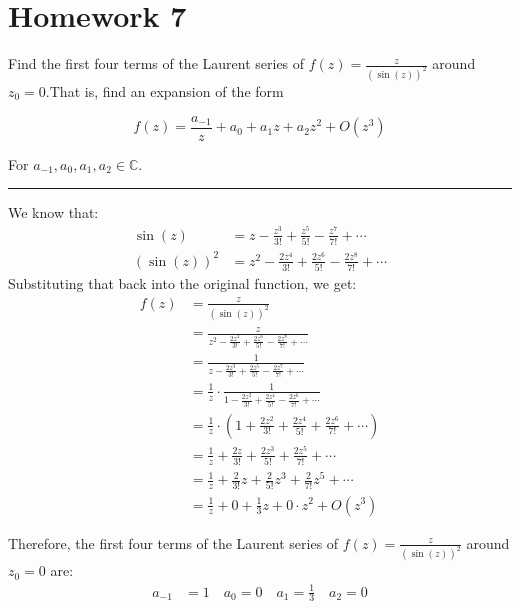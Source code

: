 \chapter{Homework 7}

\begin{example}

    Find the first four terms of the Laurent series of $f(z)=\frac z{\left(\sin(z)\right)^2}$ around $z_0=0$.That is, find an expansion of the form

    $$f(z)=\frac{a_{-1}}z+a_0+a_1z+a_2z^2+O(z^3)$$

    For $a_{-1},a_0,a_1,a_2\in\mathbb{C}.$

    \hrule
    \vspace{0.5cm}

    We know that:
    \begin{align*}
        \sin(z)                & =z-\frac{z^3}{3!}+\frac{z^5}{5!}-\frac{z^7}{7!}+\cdots      \\
        \left(\sin(z)\right)^2 & =z^2-\frac{2z^4}{3!}+\frac{2z^6}{5!}-\frac{2z^8}{7!}+\cdots
    \end{align*}
    Substituting that back into the original function, we get:
    \begin{align*}
        f(z) & =\frac z{\left(\sin(z)\right)^2}                                                    \\
             & =\frac z{z^2-\frac{2z^4}{3!}+\frac{2z^6}{5!}-\frac{2z^8}{7!}+\cdots}                \\
             & =\frac 1{z-\frac{2z^3}{3!}+\frac{2z^5}{5!}-\frac{2z^7}{7!}+\cdots}                  \\
             & =\frac 1z\cdot\frac 1{1-\frac{2z^2}{3!}+\frac{2z^4}{5!}-\frac{2z^6}{7!}+\cdots}     \\
             & =\frac 1z\cdot\left(1+\frac{2z^2}{3!}+\frac{2z^4}{5!}+\frac{2z^6}{7!}+\cdots\right) \\
             & =\frac 1z+\frac{2z}{3!}+\frac{2z^3}{5!}+\frac{2z^5}{7!}+\cdots                      \\
             & =\frac 1z+\frac 2{3!}z+\frac 2{5!}z^3+\frac 2{7!}z^5+\cdots                         \\
             & = \frac 1z + 0 + \frac 1{3}z + 0\cdot z^2 + O(z^3)
    \end{align*}

    Therefore, the first four terms of the Laurent series of $f(z)=\frac z{\left(\sin(z)\right)^2}$ around $z_0=0$ are:
    \begin{align*}
        a_{-1} & =1 \quad a_0=0 \quad a_1=\frac 1{3} \quad a_2=0
    \end{align*}
\end{example}



